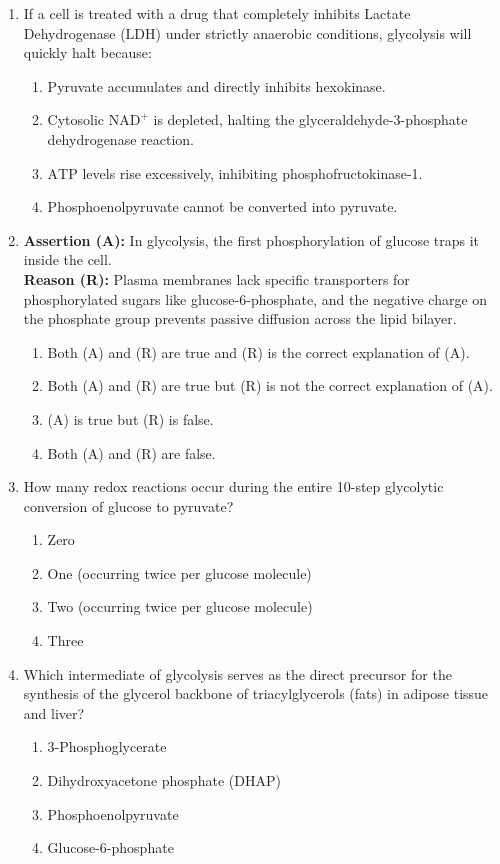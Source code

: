 \documentclass[11pt, a4paper]{article}
\begin{document}
\begin{enumerate}[label=\textbf{\arabic*.}]
\item If a cell is treated with a drug that completely inhibits Lactate Dehydrogenase ($\text{LDH}$) under strictly anaerobic conditions, glycolysis will quickly halt because:
\begin{enumerate}[label=(\Alph*)]
    \item Pyruvate accumulates and directly inhibits hexokinase.
    \item Cytosolic $\text{NAD}^+$ is depleted, halting the glyceraldehyde-3-phosphate dehydrogenase reaction.
    \item $\text{ATP}$ levels rise excessively, inhibiting phosphofructokinase-1.
    \item Phosphoenolpyruvate cannot be converted into pyruvate.
\end{enumerate}

\item \textbf{Assertion (A):} In glycolysis, the first phosphorylation of glucose traps it inside the cell. \\
\textbf{Reason (R):} Plasma membranes lack specific transporters for phosphorylated sugars like glucose-6-phosphate, and the negative charge on the phosphate group prevents passive diffusion across the lipid bilayer.
\begin{enumerate}[label=(\Alph*)]
    \item Both (A) and (R) are true and (R) is the correct explanation of (A).
    \item Both (A) and (R) are true but (R) is not the correct explanation of (A).
    \item (A) is true but (R) is false.
    \item Both (A) and (R) are false.
\end{enumerate}

\item How many redox reactions occur during the entire 10-step glycolytic conversion of glucose to pyruvate?
\begin{enumerate}[label=(\Alph*)]
    \item Zero
    \item One (occurring twice per glucose molecule)
    \item Two (occurring twice per glucose molecule)
    \item Three
\end{enumerate}

\item Which intermediate of glycolysis serves as the direct precursor for the synthesis of the glycerol backbone of triacylglycerols (fats) in adipose tissue and liver?
\begin{enumerate}[label=(\Alph*)]
    \item 3-Phosphoglycerate
    \item Dihydroxyacetone phosphate ($\text{DHAP}$)
    \item Phosphoenolpyruvate
    \item Glucose-6-phosphate
\end{enumerate}


\end{enumerate}
\end{document}
